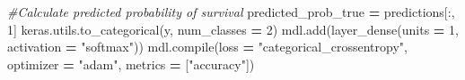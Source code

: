 \documentclass[]{book}
\newenvironment{Shaded}{\begin{snugshade}}{\end{snugshade}}
\newcommand{\DecValTok}[1]{\textcolor[rgb]{0.00,0.00,0.81}{#1}}
\newcommand{\StringTok}[1]{\textcolor[rgb]{0.31,0.60,0.02}{#1}}
\newcommand{\CommentTok}[1]{\textcolor[rgb]{0.56,0.35,0.01}{\textit{#1}}}
\newcommand{\OperatorTok}[1]{\textcolor[rgb]{0.81,0.36,0.00}{\textbf{#1}}}
\newcommand{\BuiltInTok}[1]{#1}
\newcommand{\NormalTok}[1]{#1}
\begin{document}
\begin{Shaded}
\begin{Highlighting}[]
\CommentTok{#Calculate predicted probability of survival}
\NormalTok{predicted_prob_true }\OperatorTok{=}\NormalTok{ predictions[:, }\DecValTok{1}\NormalTok{]}
\NormalTok{keras.utils.to_categorical(y, num_classes }\OperatorTok{=} \DecValTok{2}\NormalTok{)}
\NormalTok{mdl.add(layer_dense(units }\OperatorTok{=} \DecValTok{1}\NormalTok{, activation }\OperatorTok{=} \StringTok{"softmax"}\NormalTok{))}
\NormalTok{mdl.}\BuiltInTok{compile}\NormalTok{(loss }\OperatorTok{=} \StringTok{"categorical_crossentropy"}\NormalTok{, optimizer }\OperatorTok{=} \StringTok{"adam"}\NormalTok{, metrics }\OperatorTok{=}\NormalTok{ [}\StringTok{"accuracy"}\NormalTok{])}
\end{Highlighting}
\end{Shaded}


\end{document}
